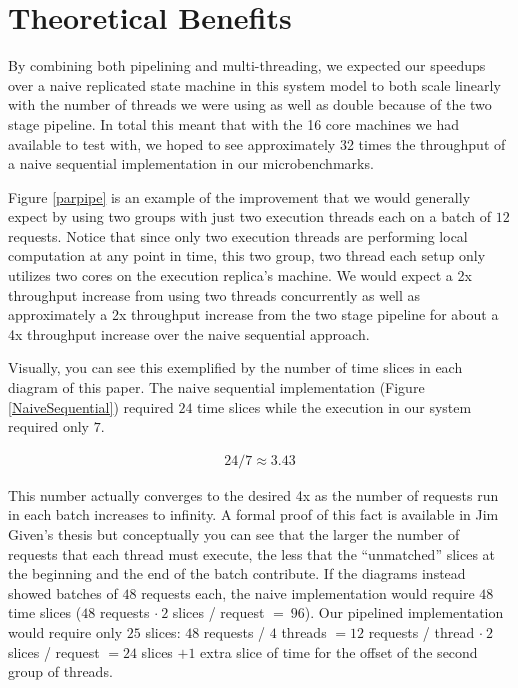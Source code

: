 \documentclass[11pt, oneside]{report}
\begin{document}
\section{Theoretical Benefits}

By combining both pipelining and multi-threading, we expected our speedups over a naive replicated state machine in this system model to both scale linearly with the number of threads we were using as well as double because of the two stage pipeline. 
In total this meant that with the 16 core machines we had available to test with, we hoped to see approximately 32 times the throughput of a naive sequential implementation in our microbenchmarks. 

Figure \ref{parpipe} is an example of the improvement that we would generally expect by using two groups with just two execution threads each on a batch of $12$ requests.
Notice that since only two execution threads are performing local computation at any point in time, this two group, two thread each setup only utilizes two cores on the execution replica's machine.
We would expect a 2x throughput increase from using two threads concurrently as well as approximately a 2x throughput increase from the two stage pipeline for about a 4x throughput increase over the naive sequential approach.

Visually, you can see this exemplified by the number of time slices in each diagram of this paper.
The naive sequential implementation (Figure \ref{NaiveSequential}) required $24$ time slices while the execution in our system required only $7$.

\begin{align*}
24 / 7 \approx 3.43
\end{align*}

This number actually converges to the desired 4x as the number of requests run in each batch increases to infinity.
A formal proof of this fact is available in Jim Given's thesis but conceptually you can see that the larger the number of requests that each thread must execute, the less that the ``unmatched'' slices at the beginning and the end of the batch contribute. 
If the diagrams instead showed batches of $48$ requests each, the naive implementation would require $48$ time slices ($48$ requests $\cdot \ 2$ slices / request $=\ 96$).
Our pipelined implementation would require only $25$ slices: $48$ requests / $4$ threads $ = 12$ requests / thread $\cdot \ 2$ slices / request $ = 24$ slices $ + 1$ extra slice of time for the offset of the second group of threads. 
\end{document}
